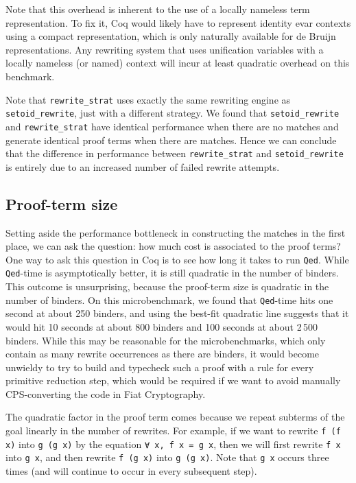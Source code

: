 \begin{subappendices}
Note that this overhead is inherent to the use of a locally nameless term representation.
To fix it, Coq would likely have to represent identity evar contexts using a compact representation, which is only naturally available for de Bruijn representations.
Any rewriting system that uses unification variables with a locally nameless (or named) context will incur at least quadratic overhead on this benchmark.

Note that \texttt{rewrite_strat} uses exactly the same rewriting engine as \texttt{setoid_rewrite}, just with a different strategy.
We found that \texttt{setoid_rewrite} and \texttt{rewrite_strat} have identical performance when there are no matches and generate identical proof terms when there are matches.
Hence we can conclude that the difference in performance between \texttt{rewrite_strat} and \texttt{setoid_rewrite} is entirely due to an increased number of failed rewrite attempts.

\subsection{Proof-term size}

Setting aside the performance bottleneck in constructing the matches in the first place, we can ask the question: how much cost is associated to the proof terms?
One way to ask this question in Coq is to see how long it takes to run \texttt{Qed}.
While \texttt{Qed}-time is asymptotically better, it is still quadratic in the number of binders.
This outcome is unsurprising, because the proof-term size is quadratic in the number of binders.
On this microbenchmark, we found that \texttt{Qed}-time hits one second at about 250 binders, and using the best-fit quadratic line suggests that it would hit 10 seconds at about 800 binders and 100 seconds at about 2\,500 binders.
While this may be reasonable for the microbenchmarks, which only contain as many rewrite occurrences as there are binders, it would become unwieldy to try to build and typecheck such a proof with a rule for every primitive reduction step, which would be required if we want to avoid manually CPS-converting the code in Fiat Cryptography.

The quadratic factor in the proof term comes because we repeat subterms of the goal linearly in the number of rewrites.
For example, if we want to rewrite \texttt{f (f x)} into \texttt{g (g x)} by the equation \texttt{∀ x, f x = g x}, then we will first rewrite \texttt{f x} into \texttt{g x}, and then rewrite \texttt{f (g x)} into \texttt{g (g x)}.
Note that \texttt{g x} occurs three times (and will continue to occur in every subsequent step).


\end{subappendices}
